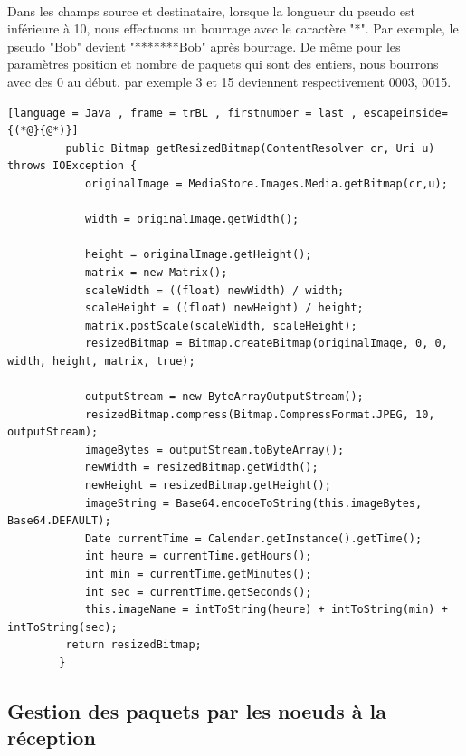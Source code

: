         \paragraph{}
          Dans les champs source et destinataire, lorsque la longueur du pseudo est inférieure à 10, nous effectuons un bourrage avec le caractère "*".  Par exemple, le pseudo "Bob" devient "*******Bob" après bourrage.
          De même pour les paramètres position et nombre de paquets qui sont des entiers, nous bourrons avec des 0 au début. par exemple 3 et 15 deviennent respectivement 0003, 0015.
         \begin{lstlisting}[language = Java , frame = trBL , firstnumber = last , escapeinside={(*@}{@*)}]
         public Bitmap getResizedBitmap(ContentResolver cr, Uri u) throws IOException {
            originalImage = MediaStore.Images.Media.getBitmap(cr,u);

            width = originalImage.getWidth();

            height = originalImage.getHeight();
            matrix = new Matrix();
            scaleWidth = ((float) newWidth) / width;
            scaleHeight = ((float) newHeight) / height;
            matrix.postScale(scaleWidth, scaleHeight);
            resizedBitmap = Bitmap.createBitmap(originalImage, 0, 0, width, height, matrix, true);

            outputStream = new ByteArrayOutputStream();
            resizedBitmap.compress(Bitmap.CompressFormat.JPEG, 10, outputStream);
            imageBytes = outputStream.toByteArray();
            newWidth = resizedBitmap.getWidth();
            newHeight = resizedBitmap.getHeight();
            imageString = Base64.encodeToString(this.imageBytes, Base64.DEFAULT);
            Date currentTime = Calendar.getInstance().getTime();
            int heure = currentTime.getHours();
            int min = currentTime.getMinutes();
            int sec = currentTime.getSeconds();
            this.imageName = intToString(heure) + intToString(min) + intToString(sec);
         return resizedBitmap;
        }
        \end{lstlisting}
        
        \subsection{Gestion des paquets  par les noeuds à la réception}
        
